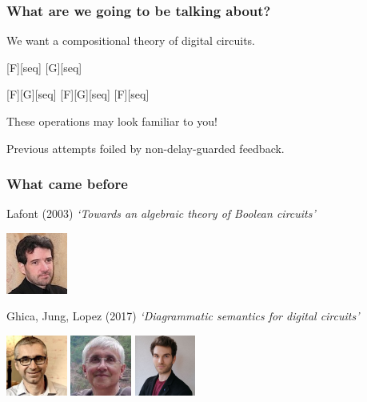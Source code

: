 \begin{frame}
    \frametitle{What are we going to be talking about?}

    \pause

    \centering
    \LARGE
    We want a \alert{compositional} theory of digital circuits.

    \vspace{0.5em}

    \pause
    [F][seq]
    [G][seq]

    \vspace{0.5em}

    \pause
    [F][G][seq]
    \pause
    \quad
    [F][G][seq]
    \pause
    \quad
    [F][seq]

    \pause
    \vspace{0.5em}

    \normalsize
    These operations may look familiar to you!

    \pause

    Previous attempts foiled by \alert{non-delay-guarded feedback}.

\end{frame}

\begin{frame}
    \frametitle{What came before}

    \pause
    \alert{Lafont (2003)}
    \emph{`Towards an algebraic theory of Boolean circuits'}

    \includegraphics[width=0.15\textwidth]{imgs/lafont}

    \vspace{0.5em}
    \pause

    \alert{Ghica, Jung, Lopez (2017)}
    \emph{`Diagrammatic semantics for digital circuits'}

    \includegraphics[width=0.15\textwidth]{imgs/ghica}
    \includegraphics[width=0.15\textwidth]{imgs/achim}
    \includegraphics[width=0.15\textwidth]{imgs/lopez}
\end{frame}

